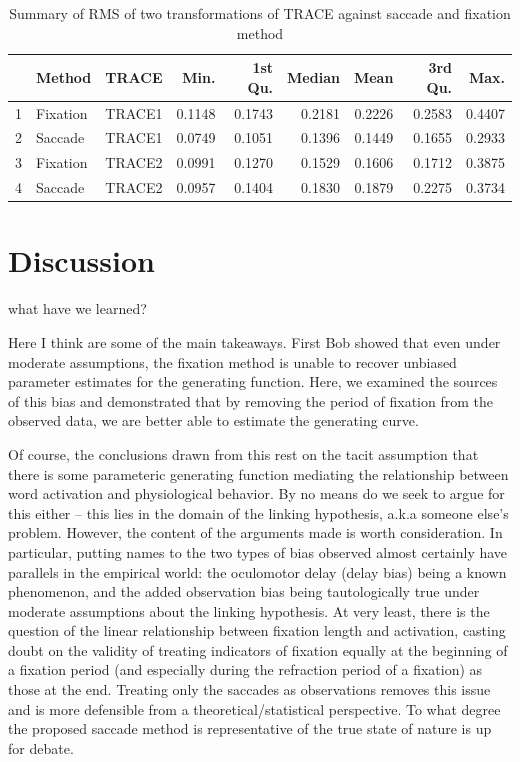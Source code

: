 \documentclass{article}
\begin{document}
\begin{table}[ht]
\centering
\begin{tabular}{rllrrrrrr}
  \hline
 & Method & TRACE & Min. & 1st Qu. & Median & Mean & 3rd Qu. & Max. \\ 
  \hline
1 & Fixation & TRACE1 & 0.1148 & 0.1743 & 0.2181 & 0.2226 & 0.2583 & 0.4407 \\ 
  2 & Saccade & TRACE1 & 0.0749 & 0.1051 & 0.1396 & 0.1449 & 0.1655 & 0.2933 \\ \hline
  3 & Fixation & TRACE2 & 0.0991 & 0.1270 & 0.1529 & 0.1606 & 0.1712 & 0.3875 \\ 
  4 & Saccade & TRACE2 & 0.0957 & 0.1404 & 0.1830 & 0.1879 & 0.2275 & 0.3734 \\ 
   \hline
\end{tabular}
\caption{Summary of RMS of two transformations of TRACE against saccade and fixation method}
\label{tab:mise_trace}
\end{table}



\section{Discussion}

what have we learned?

Here I think are some of the main takeaways. First Bob showed that even under moderate assumptions, the fixation method is unable to recover unbiased parameter estimates for the generating function. Here, we examined the sources of this bias and demonstrated that by removing the period of fixation from the observed data, we are better able to estimate the generating curve. 

Of course, the conclusions drawn from this rest on the tacit assumption that there is some parameteric generating function mediating the relationship between word activation and physiological behavior. By no means do we seek to argue for this either -- this lies in the domain of the linking hypothesis, a.k.a someone else's problem. However, the content of the arguments made is worth consideration. In particular, putting names to the two types of bias observed almost certainly have parallels in the empirical world: the oculomotor delay (delay bias) being a known phenomenon, and the added observation bias being tautologically true under moderate assumptions about the linking hypothesis. At very least, there is the question of the linear relationship between fixation length and activation, casting doubt on the validity of treating indicators of fixation equally at the beginning of a fixation period (and especially during the refraction  period of a fixation) as those at the end. Treating only the saccades as observations removes this issue and is more defensible from a theoretical/statistical perspective. To what degree the proposed saccade method is representative of the true state of nature is up for debate.
\end{document}

